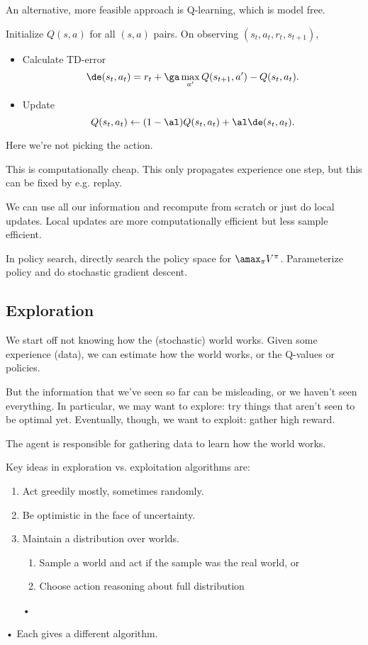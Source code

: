 An alternative, more feasible approach is Q-learning, which is model free.

\begin{alg}[Q-learning]
Initialize $Q(s,a)$ for all $(s,a)$ pairs.
On observing $(s_t,a_t,r_t,s_{t+1})$, 
\begin{itemize}
\item
Calculate TD-error
$$
\de(s_t,a_t) = r_t + \ga \max_{a'} Q(s_{t+1},a') - Q(s_t,a_t).
$$
\item Update
$$
Q(s_t,a_t) \leftarrow (1-\al) Q(s_t,a_t) + \al \de(s_t,a_t).
$$
\end{itemize}
\end{alg}
Here we're not picking the action.

This is computationally cheap. This only propagates experience one step, but this can be fixed by e.g. replay.

We can use all our information and recompute from scratch or just do local updates. Local updates are more computationally efficient but less sample efficient.

In policy search, directly search the policy space for $\amax_\pi V^\pi$. Parameterize policy and do stochastic gradient descent.

\subsection{Exploration}

We start off not knowing how the (stochastic) world works. Given some experience (data), we can estimate how the world works, or the Q-values or policies.

But the information that we've seen so far can be misleading, or we haven't seen everything. In particular, we may want to explore: try things that aren't seen to be optimal yet. Eventually, though, we want to exploit: gather high reward.

The agent is responsible for gathering data to learn how the world works.

Key ideas in exploration vs. exploitation algorithms are:
\begin{enumerate}
\item
Act greedily mostly, sometimes randomly.
\item
Be optimistic in the face of uncertainty.
\item
Maintain a distribution over worlds.
\begin{enumerate}
\item
Sample a world and act if the sample was the real world, or
\item
Choose action reasoning about full distribution
\end{enumerate}•
\end{enumerate}•
Each gives a different algorithm.

